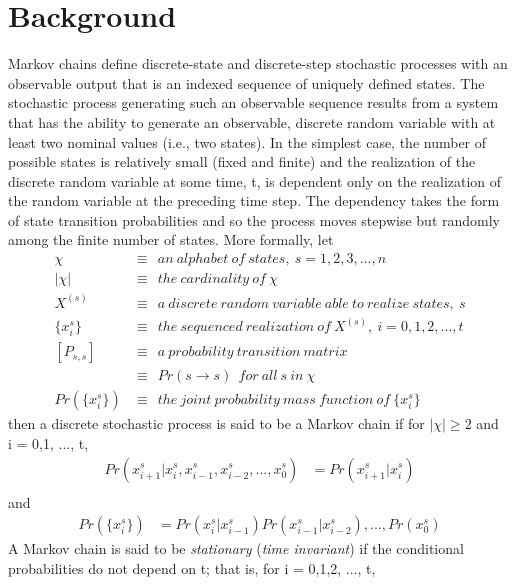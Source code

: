 \documentclass[letter,11pt]{article}
\begin{document}
\section{Background}
Markov chains define discrete-state and discrete-step stochastic processes with an observable output that is an indexed sequence of uniquely defined states. The stochastic process generating such an observable sequence results from a system that has the ability to generate an observable, discrete random variable with at least two nominal values (i.e., two states). In the simplest case, the number of possible states is relatively small (fixed and finite) and the realization of the discrete random variable at some time, t, is dependent only on the realization of the random variable at the preceding time step. The dependency takes the form of state transition probabilities and so the process moves stepwise but randomly among the finite number of states. More formally, let
 \begin{align*}
 \chi &\equiv  \ \ an \ alphabet \ of \ states, \ s = 1,2,3, ..., n\\
 |\chi| &\equiv  \ \ the \ cardinality \ of \ \chi\\
 X^{(s)} &\equiv  \ \ a \ discrete \ random \ variable \ able \ to \ realize \ states, \ s\\
 \{ x^{s}_{i}\}  &\equiv  \ \ the \ sequenced \ realization \ of \ X^{(s)}, \ i = 0,1,2, ..., t\\
 [P_{s,s}] &\equiv  \ \ a \ probability \ transition \ matrix\\
 &\equiv  \ \ Pr(s \rightarrow s) \ \ for \ all \ s \ in \ \chi\\
 Pr(\{x^{s}_{i}\}) &\equiv  \ \ the \ joint \ probability \ mass \ function \ of \ \{ x^{s}_{i}\}
  \end{align*}
then a discrete stochastic process is said to be a Markov chain if for $ |\chi| \geqslant 2$ and\\ i = 0,1, ..., t,
\begin{align*}
Pr(x^{s}_{i+1} | x^{s}_{i}, x^{s}_{i-1}, x^{s}_{i-2}, ..., x^{s}_{0}) &= Pr( x^{s}_{i+1} | x^{s}_{i})\\
\end{align*}
and
\begin{align*}
Pr(\{x^{s}_{i}\}) &= Pr(x^{s}_{i} | x^{s}_{i-1}) Pr(x^{s}_{i-1} | x^{s}_{i-2}), ..., Pr(x^{s}_{0})
\end{align*}
A Markov chain is said to be \textit{stationary} (\textit{time invariant}) if the conditional probabilities do not depend on t; that is, for i = 0,1,2, ..., t,
\end{document}
